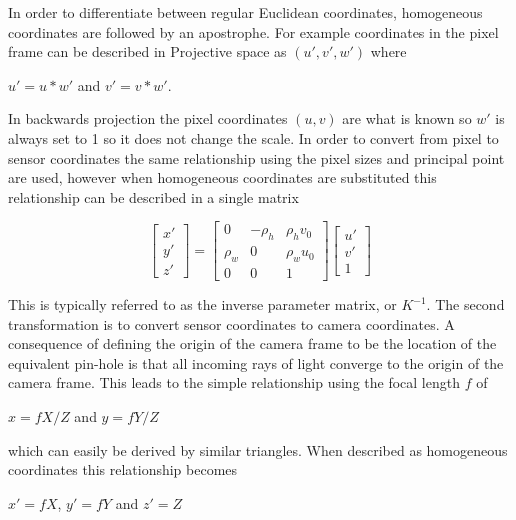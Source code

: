  In order to differentiate between regular Euclidean coordinates, homogeneous coordinates are followed by an apostrophe.  For example coordinates in the pixel frame can be described in Projective space as $(u',v',w')$ where 
 
 \begin{center}
 $u' = u*w'$ and $v'=v*w'$.
 \end{center}
 
 In backwards projection the pixel coordinates $(u,v)$ are what is known so $w'$ is always set to 1 so it does not change the scale.   In order to convert from pixel to sensor coordinates the same relationship using the pixel sizes and principal point are used, however when homogeneous coordinates are substituted this relationship can be described in a single matrix
 
 \[
 \begin{bmatrix} x' \\ y' \\ z' \end{bmatrix}
 =
 \begin{bmatrix} 
     0   & -\rho_h & \rho_h v_0 \\ 
  \rho_w &    0    & \rho_w u_0 \\
     0   &    0    &      1  
 \end{bmatrix}
 \begin{bmatrix} u' \\ v' \\ 1 \end{bmatrix}
 \]
 
 This is typically referred to as the inverse parameter matrix, or $K^{-1}$.  The second transformation is to convert sensor coordinates to camera coordinates.  A consequence of defining the origin of the camera frame to be the location of the equivalent pin-hole is that all incoming rays of light converge to the origin of the camera frame.  This leads to the simple relationship using the focal length $f$ of
  
  \begin{center}
  $x=fX/Z$  and $y=fY/Z$
  \end{center}
 
  which can easily be derived by similar triangles.  When described as homogeneous coordinates this relationship becomes 
  
  \begin{center}
  $x'=fX$, $y'=fY$ and $z'=Z$
  \end{center}
  
